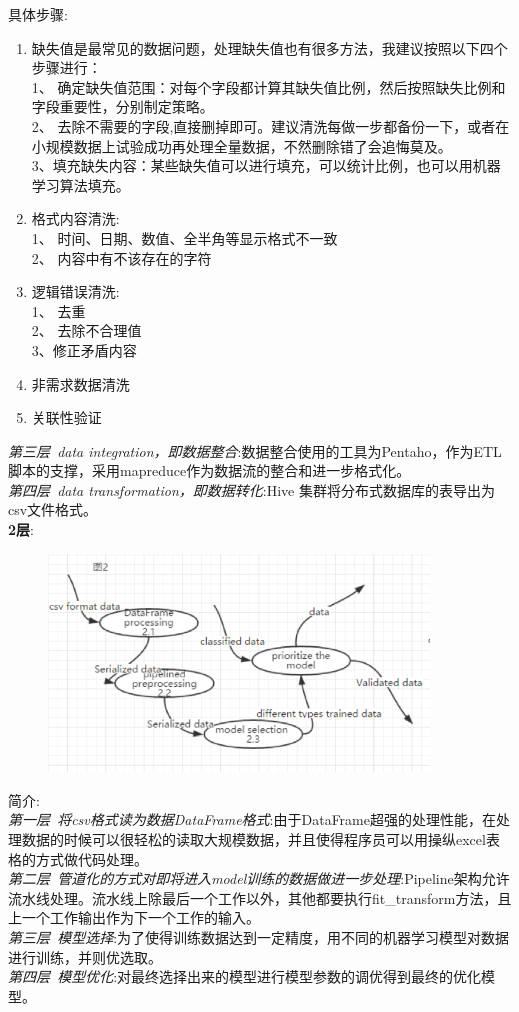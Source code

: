 \documentclass[UTF8]{ctexart}
\begin{document}
具体步骤:\\
\begin{enumerate}[1)]
\item 缺失值是最常见的数据问题，处理缺失值也有很多方法，我建议按照以下四个步骤进行：\\
1、	确定缺失值范围：对每个字段都计算其缺失值比例，然后按照缺失比例和字段重要性，分别制定策略。\\
2、	去除不需要的字段,直接删掉即可。建议清洗每做一步都备份一下，或者在小规模数据上试验成功再处理全量数据，不然删除错了会追悔莫及。\\
3、填充缺失内容：某些缺失值可以进行填充，可以统计比例，也可以用机器学习算法填充。
\item 格式内容清洗:\\
1、	时间、日期、数值、全半角等显示格式不一致\\
2、	内容中有不该存在的字符
\item 逻辑错误清洗:\\
1、	去重\\
2、	去除不合理值\\
3、修正矛盾内容
\item 非需求数据清洗
\item 关联性验证
\end{enumerate}
\emph{第三层~data integration，即数据整合}:数据整合使用的工具为Pentaho，作为ETL脚本的支撑，采用mapreduce作为数据流的整合和进一步格式化。\\
\emph{第四层~data transformation，即数据转化}:Hive 集群将分布式数据库的表导出为csv文件格式。\\

\textbf{2层}:\\
\begin{figure}[H]
\centering
\includegraphics[width = 0.9\textwidth]{recommend2-df.png}
\end{figure}
简介:\\
\emph{第一层~将csv格式读为数据DataFrame格式}:由于DataFrame超强的处理性能，在处理数据的时候可以很轻松的读取大规模数据，并且使得程序员可以用操纵excel表格的方式做代码处理。\\
\emph{第二层~管道化的方式对即将进入model训练的数据做进一步处理}:Pipeline架构允许流水线处理。流水线上除最后一个工作以外，其他都要执行fit\_transform方法，且上一个工作输出作为下一个工作的输入。\\
\emph{第三层~模型选择}:为了使得训练数据达到一定精度，用不同的机器学习模型对数据进行训练，并则优选取。\\
\emph{第四层~模型优化}:对最终选择出来的模型进行模型参数的调优得到最终的优化模型。\\
\end{document}
